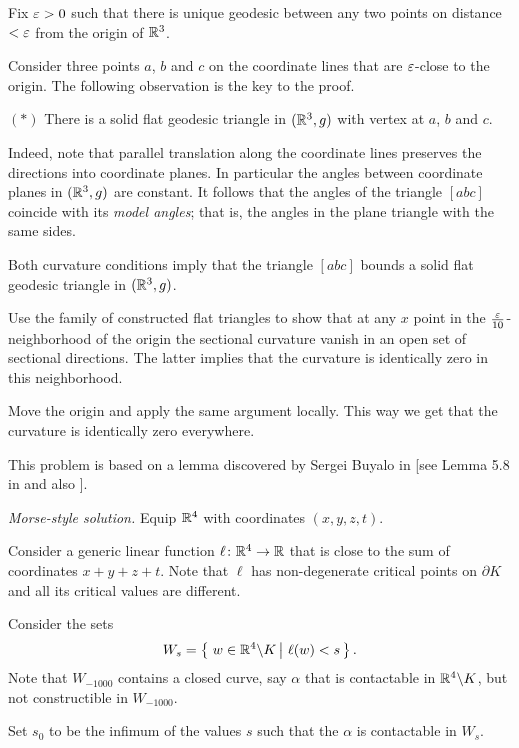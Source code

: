 Fix $\varepsilon>0$ such that there is unique geodesic between any two points on distance $<\varepsilon$ from the origin of $\mathbb{R}^3$.

Consider three points $a$, $b$ and $c$ on the coordinate lines that are $\varepsilon$-close 
to the origin.
The following observation is the key to the proof.

\begin{cl}{$({*})$}
There is a solid flat geodesic triangle in $(\mathbb{R}^3,g)$ with vertex at $a$, $b$ and $c$.
\end{cl}

Indeed, note that parallel translation along the coordinate lines preserves the directions into coordinate planes.
In particular the angles between coordinate planes in $(\mathbb{R}^3,g)$ are constant.
It follows that the angles of the triangle $[abc]$ coincide with its \emph{model angles};
that is, the angles in the plane triangle with the same sides.

Both curvature conditions imply that the triangle $[abc]$ bounds a solid flat geodesic triangle in   $(\mathbb{R}^3,g)$.

Use the family of constructed flat triangles 
to show that at any $x$ point in the $\tfrac{\varepsilon}{10}$-neighborhood of the origin
the sectional curvature 
vanish in an open set of sectional directions.
The latter implies that the curvature is identically zero 
in this neighborhood.

Move the origin and apply the same argument locally.
This way we get that the curvature is identically zero everywhere.
\qeds

This problem is based on a lemma discovered by Sergei Buyalo in [see Lemma 5.8 in  and also ].

\textit{Morse-style solution.}
Equip $\mathbb{R}^4$ with coordinates $(x,y,z,t)$.

Consider a generic linear function $\ell\colon\mathbb{R}^4\to\mathbb{R}$ that is close to the sum of coordinates $x+y+z+t$.
Note that $\ell$
has non-degenerate critical points on $\partial K$ and all its critical values are different.

Consider the sets 
$$W_s=\set{w\in \RR^4\backslash K}{\ell(w)<s}.$$
Note that $W_{-1000}$ contains a closed curve, say $\alpha$ that is contactable in $\mathbb{R}^4\backslash K$, but not constructible in $W_{-1000}$.

Set $s_0$ to be the infimum of the values $s$ such that
the $\alpha$ is contactable in $W_s$.

